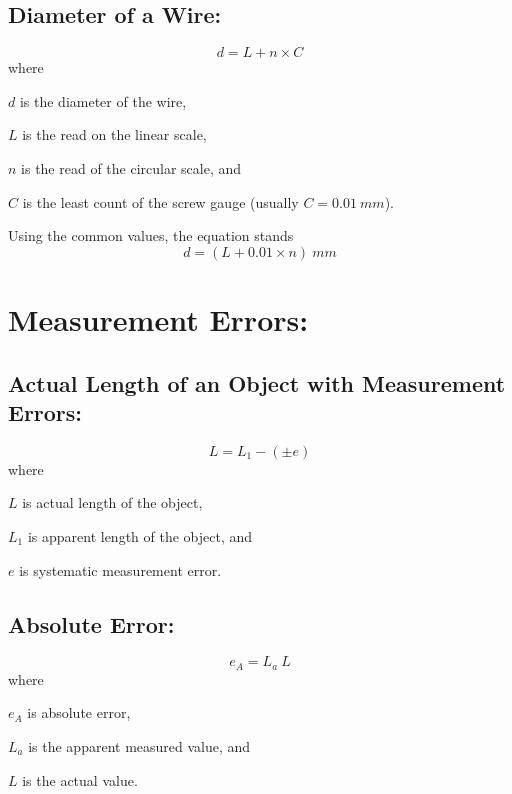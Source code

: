 \documentclass[a4paper]{report}
\begin{document}
        \subsection{Diameter of a Wire: }
            \begin{equation}
                d = L + n \times C
            \end{equation}
            where
            \begin{description}
                \item $d$ is the diameter of the wire,
                \item $L$ is the read on the linear scale,
                \item $n$ is the read of the circular scale, and
                \item $C$ is the least count of the screw gauge (usually $C=0.01\: mm$).
            \end{description}
            Using the common values, the equation stands
            \begin{equation}
                d = ( L + 0.01 \times n ) \: mm
            \end{equation}
            
    \section{Measurement Errors: }    
        \subsection{Actual Length of an Object with Measurement Errors: }
            \begin{equation}
                L = L_1 - (\pm e)
            \end{equation}
            where
            \begin{description}
                \item $L$ is actual length of the object,
                \item $L_1$ is apparent length of the object, and
                \item $e$ is systematic measurement error.
            \end{description}
        \subsection{Absolute Error: }
            \begin{equation}
                e_A = L_a ~ L
            \end{equation}
            where
            \begin{description}
                \item $e_A$ is absolute error,
                \item $L_a$ is the apparent measured value, and
                \item $L$ is the actual value.
            \end{description}
\end{document}
